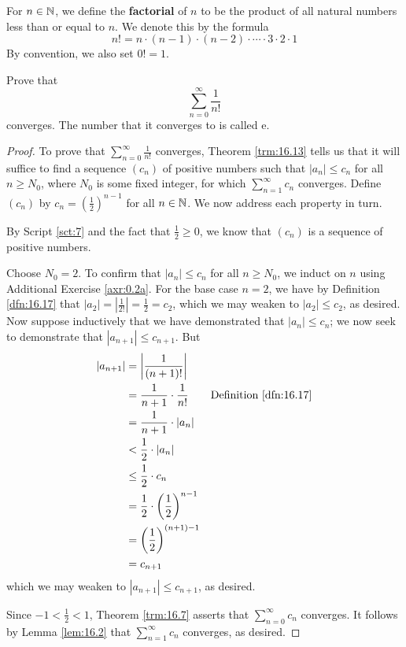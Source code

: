 \documentclass[../main.tex]{subfiles}
\begin{document}
\begin{definition}\label{dfn:16.17}
    For $n\in\mathbb{N}$, we define the \textbf{factorial} of $n$ to be the product of all natural numbers less than or equal to $n$. We denote this by the formula
    \begin{equation*}
        n! = n\cdot(n-1)\cdot(n-2)\cdot\cdots\cdot 3\cdot 2\cdot 1
    \end{equation*}
    By convention, we also set $0!=1$.
\end{definition}

\begin{exercise}\label{exr:16.18}
    Prove that
    \begin{equation*}
        \sum_{n=0}^\infty\frac{1}{n!}
    \end{equation*}
    converges. The number that it converges to is called e.
    \begin{proof}
        To prove that $\sum_{n=0}^\infty\frac{1}{n!}$ converges, Theorem \ref{trm:16.13} tells us that it will suffice to find a sequence $(c_n)$ of positive numbers such that $|a_n|\leq c_n$ for all $n\geq N_0$, where $N_0$ is some fixed integer, for which $\sum_{n=1}^\infty c_n$ converges. Define $(c_n)$ by $c_n=(\frac{1}{2})^{n-1}$ for all $n\in\mathbb{N}$. We now address each property in turn.\par
        By Script \ref{sct:7} and the fact that $\frac{1}{2}\geq 0$, we know that $(c_n)$ is a sequence of positive numbers.\par
        Choose $N_0=2$. To confirm that $|a_n|\leq c_n$ for all $n\geq N_0$, we induct on $n$ using Additional Exercise \ref{axr:0.2a}. For the base case $n=2$, we have by Definition \ref{dfn:16.17} that $|a_2|=|\frac{1}{2!}|=\frac{1}{2}=c_2$, which we may weaken to $|a_2|\leq c_2$, as desired. Now suppose inductively that we have demonstrated that $|a_n|\leq c_n$; we now seek to demonstrate that $|a_{n+1}|\leq c_{n+1}$. But
        \begin{align*}
            |a_{n+1}| &= \left| \frac{1}{(n+1)!} \right|\\
            &= \frac{1}{n+1}\cdot\frac{1}{n!}\tag*{Definition \ref{dfn:16.17}}\\
            &= \frac{1}{n+1}\cdot|a_n|\\
            &< \frac{1}{2}\cdot|a_n|\\
            &\leq \frac{1}{2}\cdot c_n\\
            &= \frac{1}{2}\cdot\left( \frac{1}{2} \right)^{n-1}\\
            &= \left( \frac{1}{2} \right)^{(n+1)-1}\\
            &= c_{n+1}
        \end{align*}
        which we may weaken to $|a_{n+1}|\leq c_{n+1}$, as desired.\par
        Since $-1<\frac{1}{2}<1$, Theorem \ref{trm:16.7} asserts that $\sum_{n=0}^\infty c_n$ converges. It follows by Lemma \ref{lem:16.2} that $\sum_{n=1}^\infty c_n$ converges, as desired.
    \end{proof}
\end{exercise}
\end{document}
